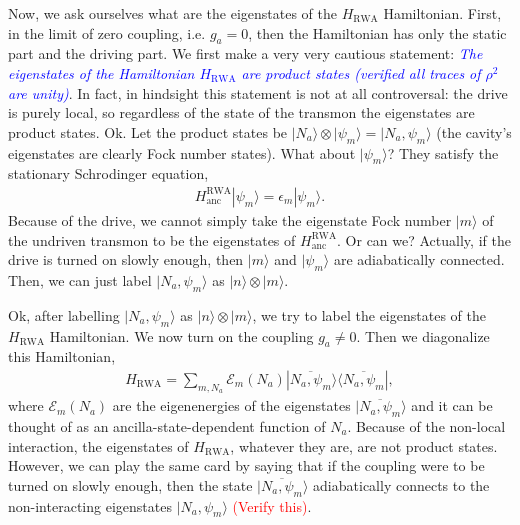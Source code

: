\documentclass{article}
\begin{document}
Now, we ask ourselves what are the eigenstates of the $H_{\text{RWA}}$ Hamiltonian. First, in the limit of zero coupling, i.e. $g_a =0$, then the Hamiltonian has only the static part and the driving part. We first make a very very cautious statement: \textit{\textcolor{blue}{The eigenstates of the Hamiltonian $H_{\text{RWA}}$ are product states (verified all traces of $\rho^2$ are unity)}}. In fact, in hindsight this statement is not at all controversal: the drive is purely local, so regardless of the state of the transmon the eigenstates are product states. Ok. Let the product states be $|N_a\rangle\otimes |\psi_m\rangle=|N_a, \psi_m\rangle$ (the cavity's eigenstates are clearly Fock number states). What about $|\psi_m\rangle$? They satisfy the stationary Schrodinger equation,
\begin{align}
    H_{\text{anc}}^{\text{RWA}}|\psi_m\rangle = \epsilon_m|\psi_m\rangle.
\end{align}
Because of the drive, we cannot simply take the eigenstate Fock number $|m\rangle$ of the undriven transmon to be the eigenstates of $H_{\text{anc}}^{\text{RWA}}$. Or can we? Actually, if the drive is turned on slowly enough, then $|m\rangle$ and $|\psi_m\rangle$ are adiabatically connected. Then, we can just label $|N_a, \psi_m\rangle$ as $|n\rangle\otimes |m\rangle$. 

Ok, after labelling $|N_a, \psi_m\rangle$
 as $|n\rangle\otimes |m\rangle$, we try to label the eigenstates of the $H_{\text{RWA}}$ Hamiltonian. We now turn on the coupling $g_a\neq 0$. Then we diagonalize this Hamiltonian,
 \begin{align}\label{eqn:diagHRWA}
     H_{\text{RWA}}=\sum_{m, N_a}\mathcal{E}_m(N_a)|\overline{N_a,\psi_m}\rangle\langle \overline{N_a,\psi_m}|,
 \end{align}
 where $\mathcal{E}_m(N_a)$ are the eigenenergies of the eigenstates $|\overline{N_a,\psi_m}\rangle$ and it can be thought of as an ancilla-state-dependent function of $N_a$. Because of the non-local interaction, the eigenstates of $H_{\text{RWA}}$, whatever they are, are not product states. However, we can play the same card by saying that if the coupling were to be turned on slowly enough, then the state $|\overline{N_a,\psi_m}\rangle$ adiabatically connects to the non-interacting eigenstates $|N_a,\psi_m\rangle$ \textcolor{red}{(Verify this)}. 
\end{document}
